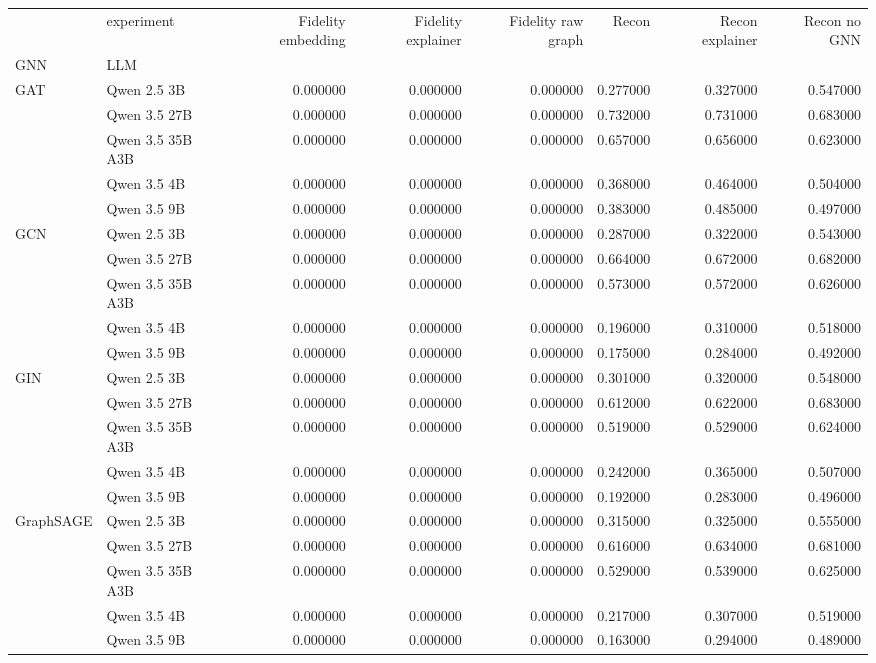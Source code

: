 \begin{tabular}{llrrrrrr}
\toprule
 & experiment & Fidelity embedding & Fidelity explainer & Fidelity raw graph & Recon & Recon explainer & Recon no GNN \\
GNN & LLM &  &  &  &  &  &  \\
\midrule
\multirow[t]{5}{*}{GAT} & Qwen 2.5 3B & 0.000000 & 0.000000 & 0.000000 & 0.277000 & 0.327000 & 0.547000 \\
 & Qwen 3.5 27B & 0.000000 & 0.000000 & 0.000000 & 0.732000 & 0.731000 & 0.683000 \\
 & Qwen 3.5 35B A3B & 0.000000 & 0.000000 & 0.000000 & 0.657000 & 0.656000 & 0.623000 \\
 & Qwen 3.5 4B & 0.000000 & 0.000000 & 0.000000 & 0.368000 & 0.464000 & 0.504000 \\
 & Qwen 3.5 9B & 0.000000 & 0.000000 & 0.000000 & 0.383000 & 0.485000 & 0.497000 \\
\cline{1-8}
\multirow[t]{5}{*}{GCN} & Qwen 2.5 3B & 0.000000 & 0.000000 & 0.000000 & 0.287000 & 0.322000 & 0.543000 \\
 & Qwen 3.5 27B & 0.000000 & 0.000000 & 0.000000 & 0.664000 & 0.672000 & 0.682000 \\
 & Qwen 3.5 35B A3B & 0.000000 & 0.000000 & 0.000000 & 0.573000 & 0.572000 & 0.626000 \\
 & Qwen 3.5 4B & 0.000000 & 0.000000 & 0.000000 & 0.196000 & 0.310000 & 0.518000 \\
 & Qwen 3.5 9B & 0.000000 & 0.000000 & 0.000000 & 0.175000 & 0.284000 & 0.492000 \\
\cline{1-8}
\multirow[t]{5}{*}{GIN} & Qwen 2.5 3B & 0.000000 & 0.000000 & 0.000000 & 0.301000 & 0.320000 & 0.548000 \\
 & Qwen 3.5 27B & 0.000000 & 0.000000 & 0.000000 & 0.612000 & 0.622000 & 0.683000 \\
 & Qwen 3.5 35B A3B & 0.000000 & 0.000000 & 0.000000 & 0.519000 & 0.529000 & 0.624000 \\
 & Qwen 3.5 4B & 0.000000 & 0.000000 & 0.000000 & 0.242000 & 0.365000 & 0.507000 \\
 & Qwen 3.5 9B & 0.000000 & 0.000000 & 0.000000 & 0.192000 & 0.283000 & 0.496000 \\
\cline{1-8}
\multirow[t]{5}{*}{GraphSAGE} & Qwen 2.5 3B & 0.000000 & 0.000000 & 0.000000 & 0.315000 & 0.325000 & 0.555000 \\
 & Qwen 3.5 27B & 0.000000 & 0.000000 & 0.000000 & 0.616000 & 0.634000 & 0.681000 \\
 & Qwen 3.5 35B A3B & 0.000000 & 0.000000 & 0.000000 & 0.529000 & 0.539000 & 0.625000 \\
 & Qwen 3.5 4B & 0.000000 & 0.000000 & 0.000000 & 0.217000 & 0.307000 & 0.519000 \\
 & Qwen 3.5 9B & 0.000000 & 0.000000 & 0.000000 & 0.163000 & 0.294000 & 0.489000 \\
\cline{1-8}
\bottomrule
\end{tabular}

